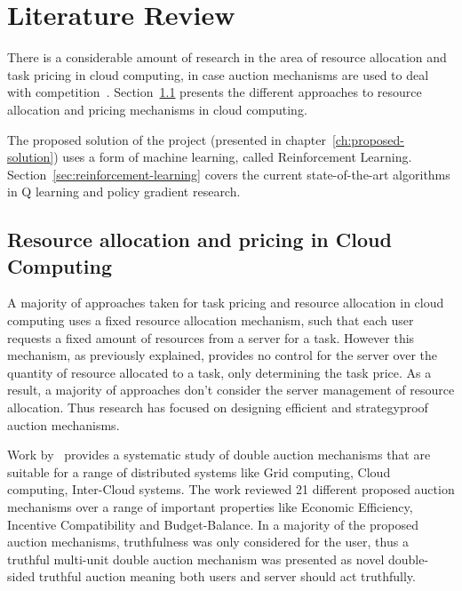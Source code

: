 \chapter{Literature Review}\label{ch:literature-review}
There is a considerable amount of research in the area of resource allocation and task pricing in cloud computing,
in case auction mechanisms are used to deal with competition~\citep{KUMAR2017234,Bi2019}.
Section~\ref{sec:resource-allocation-and-pricing-in-cloud-computing} presents the different approaches to resource
allocation and pricing mechanisms in cloud computing.

The proposed solution of the project (presented in chapter~\ref{ch:proposed-solution}) uses a form of
machine learning, called Reinforcement Learning. Section~\ref{sec:reinforcement-learning} covers the current
state-of-the-art algorithms in Q learning and policy gradient research.

\section{Resource allocation and pricing in Cloud Computing}\label{sec:resource-allocation-and-pricing-in-cloud-computing}
A majority of approaches taken for task pricing and resource allocation in cloud computing uses a fixed resource
allocation mechanism, such that each user requests a fixed amount of resources from a server for a task. However this
mechanism, as previously explained, provides no control for the server over the quantity of resource allocated to a task,
only determining the task price. As a result, a majority of approaches don't consider the server management of resource
allocation. Thus research has focused on designing efficient and strategyproof auction mechanisms.

Work by~\cite{KUMAR2017234} provides a systematic study of double auction mechanisms that are suitable for a range
of distributed systems like Grid computing, Cloud computing, Inter-Cloud systems. The work reviewed 21 different
proposed auction mechanisms over a range of important properties like Economic Efficiency,
Incentive Compatibility and Budget-Balance. In a majority of the proposed auction mechanisms, truthfulness was only
considered for the user, thus a truthful multi-unit double auction mechanism was presented as novel double-sided
truthful auction meaning both users and server should act truthfully.

